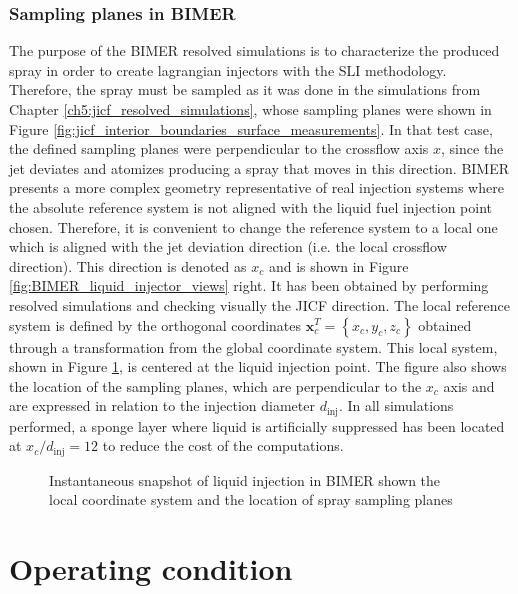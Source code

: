 \subsubsection*{Sampling planes in BIMER}

The purpose of the BIMER resolved simulations is to characterize the produced spray in order to create lagrangian injectors with the SLI methodology. Therefore, the spray must be sampled as it was done in the simulations from Chapter \ref{ch5:jicf_resolved_simulations}, whose sampling planes were shown in Figure \ref{fig:jicf_interior_boundaries_surface_measurements}. In that test case, the defined sampling planes were perpendicular to the crossflow axis $x$, since the jet deviates and atomizes producing a spray that moves in this direction. BIMER presents a more complex geometry representative of real injection systems where the absolute reference system is not aligned with the liquid fuel injection point chosen. Therefore, it is convenient to change the reference system to a local one which is aligned with the jet deviation direction (i.e. the local crossflow direction). This direction is denoted as $x_c$ and is shown in Figure \ref{fig:BIMER_liquid_injector_views} right. It has been obtained by performing resolved simulations and checking visually the JICF direction. The local reference system is defined by the orthogonal coordinates $\textbf{x}_c^T =\left\lbrace x_c, y_c, z_c \right\rbrace$ obtained through a transformation from the global coordinate system. This local system, shown in Figure \ref{fig:BIMER_local_FoR_and_sampling_planes}, is centered at the liquid injection point. The figure also shows the location of the sampling planes, which are perpendicular to the $x_c$ axis and are expressed in relation to the injection diameter $d_\mathrm{inj}$. In all simulations performed, a sponge layer where liquid is artificially suppressed has been located at $x_c/d_\mathrm{inj} = 12$ to reduce the cost of the computations.

\begin{figure}[h!]
	\centering
	\caption{Instantaneous snapshot of liquid injection in BIMER shown the local coordinate system and the location of spray sampling planes}	\label{fig:BIMER_local_FoR_and_sampling_planes}
\end{figure}


\section{Operating condition}
\label{sec:ch8_BIMER_operating_condition}

